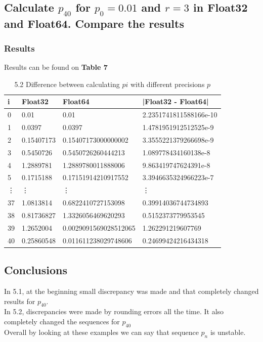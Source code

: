 \documentclass[11pt]{article}
\begin{document}
\subsection{Calculate $p_{40}$ for $p_0=0.01$ and $r=3$ in Float32 and Float64. Compare the results}
\subsubsection{Results}
Results can be found on \textbf{Table 7}
\begin{table}[h]
    \centering
    \caption{5.2 Difference between calculating $pi$ with different precisions $p$}
    \begin{tabular}{|l|l|l|l|}
    \hline
        i & Float32 & Float64 & |Float32 - Float64| \\ \hline
        0 & 0.01 & 0.01 & 2.2351741811588166e-10 \\ \hline
        1 & 0.0397 & 0.0397 & 1.4781951912512525e-9 \\ \hline
        2 & 0.15407173 & 0.15407173000000002 & 3.3555221379266698e-9 \\ \hline
        3 & 0.5450726 & 0.5450726260444213 & 1.089778434160138e-8 \\ \hline
        4 & 1.2889781 & 1.2889780011888006 & 9.863419747624391e-8 \\ \hline
        5 & 0.1715188 & 0.17151914210917552 & 3.3946635324966223e-7 \\ \hline
        \vdots & \vdots & \vdots & \vdots \\ \hline
        37 & 1.0813814 & 0.6822410727153098 & 0.39914036744734893 \\ \hline
        38 & 0.81736827 & 1.3326056469620293 & 0.5152373779953545 \\ \hline
        39 & 1.2652004 & 0.0029091569028512065 & 1.262291219607769 \\ \hline
        40 & 0.25860548 & 0.011611238029748606 & 0.24699424216434318 \\ \hline
    \end{tabular}
\end{table}
\subsection{Conclusions}
In 5.1, at the beginning small discrepancy was made and that completely changed results for $p_40$.\\
In 5.2, discrepancies were made by rounding errors all the time. It also completely changed the sequences for $p_40$\\
Overall by looking at these examples we can say that sequence $p_n$ is unstable.
\end{document}
